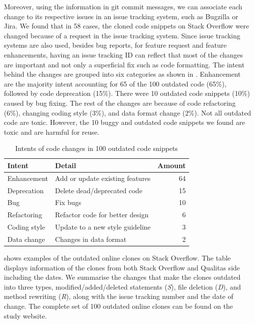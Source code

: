 \documentclass[10pt,journal,compsoc]{IEEEtran}
\begin{document}
Moreover, using the information in git commit messages, we can associate each
change to its respective issues in an issue tracking system, such as Bugzilla or
Jira. We found that in 58 cases, the cloned code snippets on Stack Overflow were
changed because of a request in the issue tracking system. Since issue tracking
systems are also used, besides bug reports, for feature request and feature
enhancements, having an issue tracking ID can reflect that most of the changes are important
and not only a superficial fix such as code formatting. The intent behind
the changes are grouped into six categories as shown in .
Enhancement are the majority intent accounting for 65 of the 100 outdated code (65\%), followed 
by code deprecation (15\%). There were 10 outdated code snippets (10\%) caused by bug fixing.
The rest of the changes are because of code refactoring (6\%), changing coding style (3\%), and 
data format change (2\%).
Not all outdated code are toxic. However, the 10 buggy and outdated code snippets 
we found are toxic and are harmful for reuse.

\begin{table}
	\centering
	\begin{tabular}{llr}
		\toprule
		Intent & Detail & Amount \\
		\midrule
		Enhancement & Add or update existing features & 64 \\
		Deprecation & Delete dead/deprecated code & 15 \\
		Bug & Fix bugs & 10 \\
		Refactoring & Refactor code for better design & 6 \\
		Coding style & Update to a new style guideline & 3 \\
		Data change & Changes in data format & 2 \\
		\bottomrule
	\end{tabular}
	\label{tab:intent_outdated}
	\caption{Intents of code changes in 100 outdated code snippets}
\end{table}


 shows examples of the outdated online clones on
Stack Overflow. The table displays information of the clones from both Stack
Overflow and Qualitas side including the dates. We summarise the changes that
make the clones outdated into three types, modified/added/deleted statements
(\textit{S}), file deletion (\textit{D}), and method rewriting (\textit{R}),
along with the issue tracking number and the date of change. The complete set of
100 outdated online clones can be found on the study website.
\end{document}
